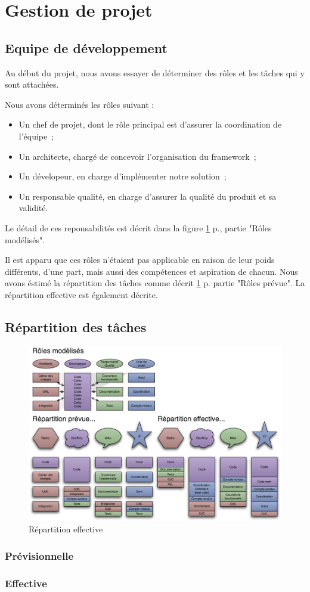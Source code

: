 \section{Gestion de projet}
\subsection{Equipe de développement}
Au début du projet, nous avons essayer de déterminer des rôles et les tâches qui y sont attachées.

Nous avons déterminés les rôles suivant :
\begin{itemize}
 \item Un chef de projet, dont le rôle principal est d'assurer la coordination de l'équipe~;
 \item Un architecte, chargé de concevoir l'organisation du framework~;
 \item Un dévelopeur, en charge d'implémenter notre solution~;
 \item Un responsable qualité, en charge d'assurer la qualité du produit et sa validité.
\end{itemize}
Le détail de ces reponsabilités est décrit dans la figure \ref{fig:repart_effect} p.\pageref{ }, partie "Rôles modélisés".

Il est apparu que ces rôles n'étaient pas applicable en raison de leur poids différents, d'une part, mais aussi des compétences et aspiration de chacun. Nous avons éstimé la répartition des tâches comme décrit \ref{fig:repart_effect} p.\pageref{fig:repart_effect} partie "Rôles prévue".
La répartition effective est également décrite.

\subsection{Répartition des tâches}
\begin{figure}[thbp]
	\centering
		\includegraphics[angle=90, scale=0.7]{../diagrammes/repartition_taches.pdf}
	\caption{Répartition effective}
	\label{fig:repart_effect}
\end{figure}
\subsubsection{Prévisionnelle}

\subsubsection{Effective}